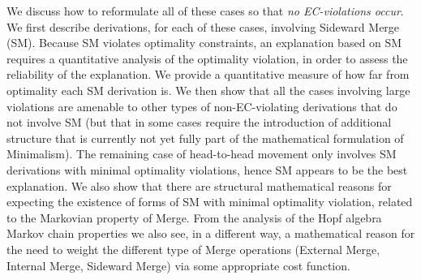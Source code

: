 \documentclass[12pt]{amsart}
\numberwithin{equation}{section}
\begin{document}
We discuss how to reformulate all of these cases
so that {\em no EC-violations occur}. We first describe
derivations, for each of these cases, involving Sideward Merge (SM). 
Because SM violates optimality constraints, an explanation based on SM 
requires a quantitative analysis of the optimality violation, in order to
assess the reliability of the explanation. We provide a quantitative
measure of how far from optimality each SM derivation is. We then
show that all the cases involving large violations are amenable to
other types of non-EC-violating derivations that do not involve SM
(but that in some cases require the introduction of additional structure
that is currently not yet fully part of the mathematical formulation of Minimalism).
The remaining case of head-to-head movement
only involves SM derivations with minimal optimality violations, hence
SM appears to be the best explanation. We also show that there
are structural mathematical reasons for expecting the existence of
forms of SM with minimal optimality violation, related to 
the Markovian property of Merge. From the analysis of the Hopf
algebra Markov chain properties we also see, in a different way,
a mathematical reason for the need to weight the different type of 
Merge operations (External Merge, Internal Merge, Sideward Merge) 
via some appropriate cost function. 

\smallskip
\end{document}

